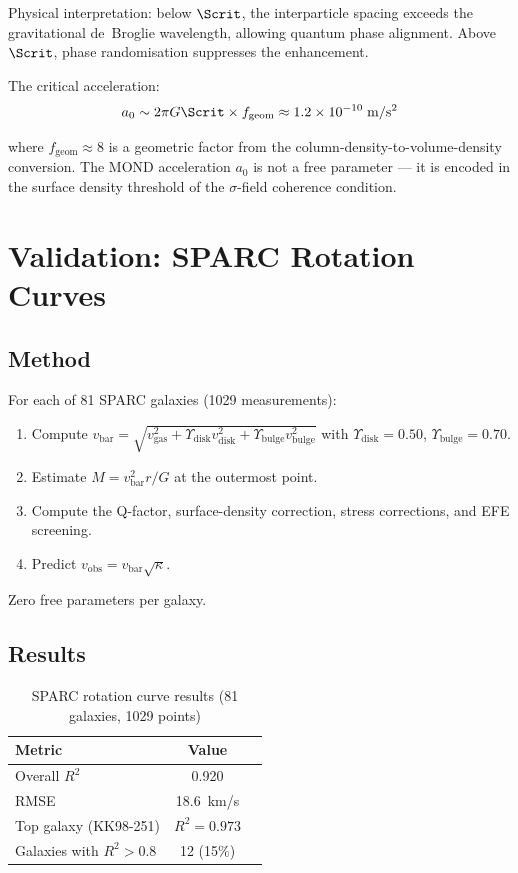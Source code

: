 Physical interpretation: below $\Scrit$, the interparticle spacing exceeds the gravitational de~Broglie wavelength, allowing quantum phase alignment.  Above $\Scrit$, phase randomisation suppresses the enhancement.

The critical acceleration:
\begin{equation}
  a_0 \sim 2\pi G\Scrit \times f_{\mathrm{geom}} \approx 1.2\times10^{-10}\;\mathrm{m/s^2}
\end{equation}

where $f_{\mathrm{geom}} \approx 8$ is a geometric factor from the column-density-to-volume-density conversion.  The MOND acceleration $a_0$ is not a free parameter --- it is encoded in the surface density threshold of the $\sigma$-field coherence condition.

\section{Validation: SPARC Rotation Curves}

\subsection{Method}

For each of 81 SPARC galaxies (1029 measurements):
\begin{enumerate}
  \item Compute $v_{\mathrm{bar}} = \sqrt{v_{\mathrm{gas}}^2 + \Upsilon_{\mathrm{disk}}v_{\mathrm{disk}}^2 + \Upsilon_{\mathrm{bulge}}v_{\mathrm{bulge}}^2}$ with $\Upsilon_{\mathrm{disk}} = 0.50$, $\Upsilon_{\mathrm{bulge}} = 0.70$.
  \item Estimate $M = v_{\mathrm{bar}}^2 r/G$ at the outermost point.
  \item Compute the Q-factor, surface-density correction, stress corrections, and EFE screening.
  \item Predict $v_{\mathrm{obs}} = v_{\mathrm{bar}}\sqrt{\kappa}$.
\end{enumerate}

Zero free parameters per galaxy.

\subsection{Results}

\begin{table}[h]
  \centering
  \caption{SPARC rotation curve results (81 galaxies, 1029 points)}
  \begin{tabular}{@{}lcc@{}}
    \toprule
    Metric & Value \\
    \midrule
    Overall $R^2$ & 0.920 \\
    RMSE & 18.6~km/s \\
    Top galaxy (KK98-251) & $R^2 = 0.973$ \\
    Galaxies with $R^2 > 0.8$ & 12 (15\%) \\
    \bottomrule
  \end{tabular}
\end{table}

